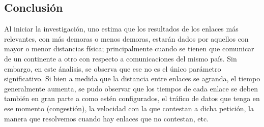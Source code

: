\subsection{Conclusi\'on}
Al iniciar la investigaci\'on, uno estima que los resultados de los enlaces m\'as relevantes, con m\'as demoras o menos demoras, estar\'an dados por aquellos con mayor o menor distancias f\'isica; principalmente cuando se tienen que comunicar de un continente a otro con respecto a comunicaciones del mismo pa\'is. Sin embargo, en este \'analisis, se observa que ese no es el \'unico par\'ametro significativo. Si bien a medida que la distancia entre enlaces se agranda, el tiempo generalmente aumenta, se pudo observar que los tiempos de cada enlace se deben tambi\'en en gran parte a como est\'en configurados, el tr\'afico de datos que tenga en ese momento (congesti\'on), la velocidad con la que contestan a dicha petici\'on, la manera que resolvemos cuando hay enlaces que no contestan, etc.